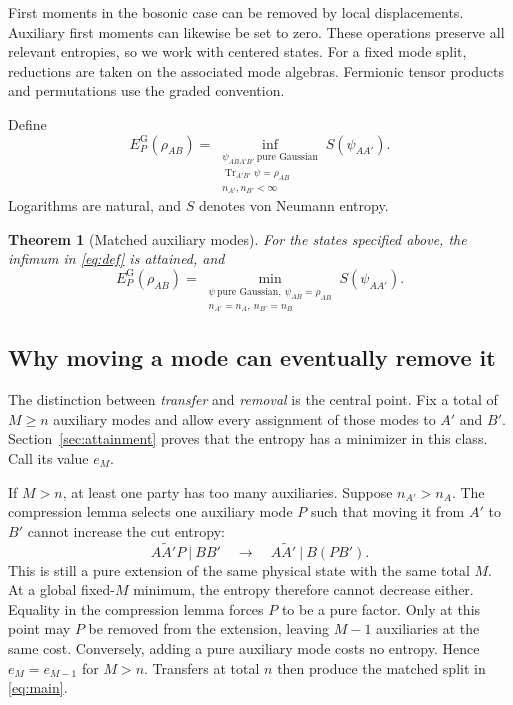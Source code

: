 \documentclass[11pt,a4paper]{article}
\numberwithin{equation}{section}
\newtheorem{theorem}{Theorem}[section]
\theoremstyle{remark}
\newcommand{\EPG}{E_P^{\mathrm G}}
\newcommand{\Tr}{\operatorname{Tr}}
\begin{document}
First moments in the bosonic case can be removed by local displacements. Auxiliary first moments can likewise be set to zero. These operations preserve all relevant entropies, so we work with centered states. For a fixed mode split, reductions are taken on the associated mode algebras. Fermionic tensor products and permutations use the graded convention.

Define
\begin{equation}\label{eq:def}
 \EPG(\rho_{AB})=
 \inf_{\substack{\psi_{ABA'B'}\ \text{pure Gaussian}\\
       \Tr_{A'B'}\psi=\rho_{AB}\\ n_{A'},n_{B'}<\infty}} S(\psi_{AA'}).
\end{equation}
Logarithms are natural, and $S$ denotes von Neumann entropy.
\begin{theorem}[Matched auxiliary modes]\label{thm:main}
For the states specified above, the infimum in \eqref{eq:def} is attained, and
\begin{equation}\label{eq:main}
 \EPG(\rho_{AB})=
 \min_{\substack{\psi\ \text{pure Gaussian},\ \psi_{AB}=\rho_{AB}\\
                    n_{A'}=n_A,\ n_{B'}=n_B}} S(\psi_{AA'}).
\end{equation}
\end{theorem}

\subsection{Why moving a mode can eventually remove it}
The distinction between \emph{transfer} and \emph{removal} is the central point. Fix a total of $M\ge n$ auxiliary modes and allow every assignment of those modes to $A'$ and $B'$. Section~\ref{sec:attainment} proves that the entropy has a minimizer in this class. Call its value $e_M$.

If $M>n$, at least one party has too many auxiliaries. Suppose $n_{A'}>n_A$. The compression lemma selects one auxiliary mode $P$ such that moving it from $A'$ to $B'$ cannot increase the cut entropy:
\begin{equation}\label{eq:transfer-picture}
 A\widetilde A'P\ \big|\ BB'
 \quad\longrightarrow\quad
 A\widetilde A'\ \big|\ B(PB').
\end{equation}
This is still a pure extension of the same physical state with the same total $M$. At a global fixed-$M$ minimum, the entropy therefore cannot decrease either. Equality in the compression lemma forces $P$ to be a pure factor. Only at this point may $P$ be removed from the extension, leaving $M-1$ auxiliaries at the same cost. Conversely, adding a pure auxiliary mode costs no entropy. Hence $e_M=e_{M-1}$ for $M>n$. Transfers at total $n$ then produce the matched split in \eqref{eq:main}.
\end{document}
